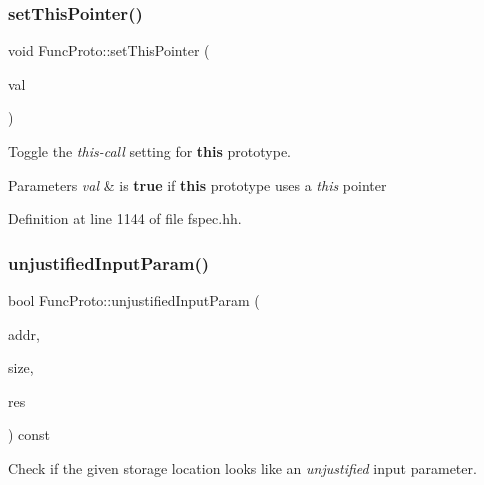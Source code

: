\subsubsection{\texorpdfstring{setThisPointer()}{setThisPointer()}}
{\footnotesize\ttfamily void Func\+Proto\+::set\+This\+Pointer (\begin{DoxyParamCaption}\item[{bool}]{val }\end{DoxyParamCaption})\hspace{0.3cm}{\ttfamily [inline]}}



Toggle the {\itshape this-\/call} setting for {\bfseries{this}} prototype. 


\begin{DoxyParams}{Parameters}
{\em val} & is {\bfseries{true}} if {\bfseries{this}} prototype uses a {\itshape this} pointer \\
\hline
\end{DoxyParams}


Definition at line 1144 of file fspec.\+hh.

\mbox{\label{class_func_proto_af0fe71f261f3593c98efe396973d5775}} 
\subsubsection{\texorpdfstring{unjustifiedInputParam()}{unjustifiedInputParam()}}
{\footnotesize\ttfamily bool Func\+Proto\+::unjustified\+Input\+Param (\begin{DoxyParamCaption}\item[{const \mbox{\hyperlink{class_address}{Address}} \&}]{addr,  }\item[{int4}]{size,  }\item[{\mbox{\hyperlink{struct_varnode_data}{Varnode\+Data}} \&}]{res }\end{DoxyParamCaption}) const}



Check if the given storage location looks like an {\itshape unjustified} input parameter. 


